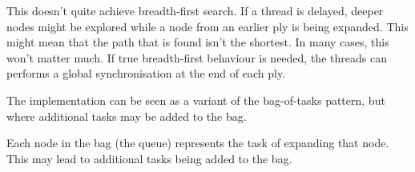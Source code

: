 
\begin{slide}

This doesn't quite achieve breadth-first search.  If a thread is delayed,
deeper nodes might be explored while a node from an earlier ply is being
expanded.  This might mean that the path that is found isn't the shortest.  In
many cases, this won't matter much.  If true breadth-first behaviour is
needed, the threads can performs a global synchronisation at the end of each
ply.
\end{slide}


\begin{slide}

The implementation can be seen as a variant of the bag-of-tasks pattern, but
where additional tasks may be added to the bag.

Each node in the bag (the queue) represents the task of expanding that node.
This may lead to additional tasks being added to the bag.
\end{slide}

